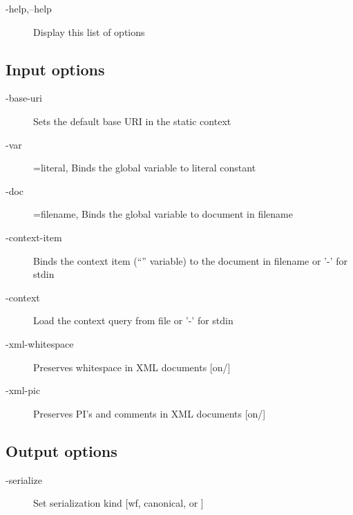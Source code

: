 \begin{description}
\item[-help,--help]   Display this list of options
\end{description}

\subsection{Input options}
\label{sec:inputoptions}
\begin{description}
\item[-base-uri]  Sets the default base URI in the static context
\item[-var]  =literal, Binds the global variable  to literal constant
\item[-doc]  =filename, Binds the global variable  to document in filename
\item[-context-item] Binds the context item (``'' variable) to the document in filename or '-' for stdin
\item[-context]  Load the context query from file or '-' for stdin
\end{description}

\begin{description}
\item[-xml-whitespace]  Preserves whitespace in XML documents [on/]
\item[-xml-pic]  Preserves PI's and comments in XML documents [on/]
\end{description}

\subsection{Output options}
\begin{description}
\item[-serialize]  Set serialization kind [wf, canonical, or ]
\end{description}

